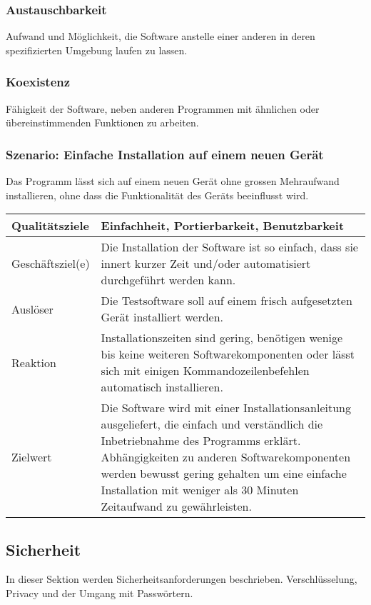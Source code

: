 \documentclass[
	ngerman,
	toc=listof, %
	toc=bibliography, %
	footnotes=multiple, %
	parskip=half, %
	numbers=noendperiod %
]{scrartcl}
\begin{document}
		\subsubsection{Austauschbarkeit}
		Aufwand und Möglichkeit, die Software anstelle einer anderen in deren spezifizierten Umgebung laufen zu lassen.

		\subsubsection{Koexistenz}
		Fähigkeit der Software, neben anderen Programmen mit ähnlichen oder übereinstimmenden Funktionen zu arbeiten.

		\subsubsection{Szenario: Einfache Installation auf einem neuen Gerät}
		Das Programm lässt sich auf einem neuen Gerät ohne grossen Mehraufwand installieren, ohne dass die Funktionalität des Geräts beeinflusst wird.

		\begin{tabularx}{\textwidth}{lX}
			\toprule
			Qualitätsziele & Einfachheit, Portierbarkeit, Benutzbarkeit  \\
			\midrule
			Geschäftsziel(e) & Die Installation der Software ist so einfach, dass sie innert kurzer Zeit und/oder automatisiert durchgeführt werden kann.  \\
			\midrule
			Auslöser & Die Testsoftware soll auf einem frisch aufgesetzten Gerät installiert werden.  \\
			\midrule
			Reaktion & Installationszeiten sind gering, benötigen wenige bis keine weiteren Softwarekomponenten oder lässt sich mit einigen Kommandozeilenbefehlen automatisch installieren.  \\
			\midrule
			Zielwert & Die Software wird mit einer Installationsanleitung ausgeliefert, die einfach und verständlich die Inbetriebnahme des Programms erklärt. Abhängigkeiten zu anderen Softwarekomponenten werden bewusst gering gehalten um eine einfache Installation mit weniger als 30 Minuten Zeitaufwand zu gewährleisten.  \\
			\bottomrule
		\end{tabularx}


	\subsection{Sicherheit}
	In dieser Sektion werden Sicherheitsanforderungen beschrieben. 
	Verschlüsselung, Privacy und der Umgang mit Passwörtern.
\end{document}
